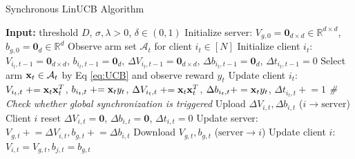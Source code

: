 
\begin{algorithm}
    \caption{Synchronous LinUCB Algorithm} \label{algo:SyncLinUCB}
  \begin{algorithmic}[4]
    \STATE \textbf{Input:} threshold $D$, $\sigma, \lambda > 0$, $\delta \in (0,1)$
    \STATE Initialize server: ${V}_{g, 0}=\textbf{0}_{d \times d} \in \mathbb{R}^{d \times d}$, ${b}_{g,0}=\textbf{0}_{d} \in \mathbb{R}^{d}$
        \STATE Observe arm set $\mathcal{A}_{t}$ for client $i_{t} \in [N]$
            \STATE Initialize client $i_{t}$: ${V}_{i_{t}, t-1}=\textbf{0}_{d \times d}$, ${b}_{i_{t},t-1}=\textbf{0}_{d}$, $\Delta{V}_{i_{t}, t-1}=\textbf{0}_{d \times d}$, $\Delta{b}_{i_{t},t-1}=\textbf{0}_{d}$, $\Delta t_{i_{t},t-1}=0$
        \ENDIF
        \STATE Select arm $\mathbf{x}_{t}\in\mathcal{A}_{t}$ by Eq \eqref{eq:UCB} and observe reward $y_{t}$
        \STATE Update client $i_{t}$:
            ${V}_{i_{t},t} \mathrel{+}= \mathbf{x}_{t}\mathbf{x}_{t}^{T}$, ${b}_{i_{t},t} \mathrel{+}= \mathbf{x}_{t}y_{t}$, $\Delta{V}_{i_{t},t} \mathrel{+}= \mathbf{x}_{t}\mathbf{x}_{t}^{T}$, $\Delta{b}_{i_{t},t}+=\mathbf{x}_{t}y_{t}$, $\Delta t_{i_{t},t} \mathrel{+}= 1$  \newline
            \textit{\# Check whether global synchronization is triggered}
                \STATE Upload $\Delta{V}_{i,t},\Delta{b}_{i,t}$ ($i \rightarrow \text{server}$)
                \STATE Client $i$ reset $\Delta{V}_{i,t}=\textbf{0}$, $\Delta{b}_{i,t}=\textbf{0}$, $\Delta t_{i,t}=0$
                \STATE Update server: $V_{g,t}\mathrel{+}=\Delta V_{i,t},b_{g,t}\mathrel{+}=\Delta b_{i,t}$
            \ENDFOR
                \STATE Download ${V}_{g,t},{b}_{g,t}$ ($\text{server} \rightarrow i$)
                \STATE Update client $i$: $V_{i,t}=V_{g,t},b_{j,t}=b_{g,t}$
            \ENDFOR
        \ENDIF
    \ENDFOR
  \end{algorithmic}
\end{algorithm}

